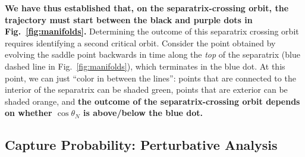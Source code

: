 \documentclass[11pt,
        usenames, %
        dvipsnames %
    ]{article}
\begin{document}
\textbf{We have thus established that, on the separatrix-crossing orbit, the
trajectory must start between the black and purple dots in
Fig.~\ref{fig:manifolds}.} Determining the outcome of this separatrix crossing
orbit requires identifying a second critical orbit. Consider the point obtained
by evolving the saddle point backwards in time along the \emph{top} of the
separatrix (blue dashed line in Fig.~\ref{fig:manifolds}), which terminates in
the blue dot. At this point, we can just ``color in between the lines'': points
that are connected to the interior of the separatrix can be shaded green, points
that are exterior can be shaded orange, and \textbf{the outcome of the
separatrix-crossing orbit depends on whether $\cos \theta_N$ is above/below the
blue dot.}

\subsection{Capture Probability: Perturbative Analysis}
\end{document}
